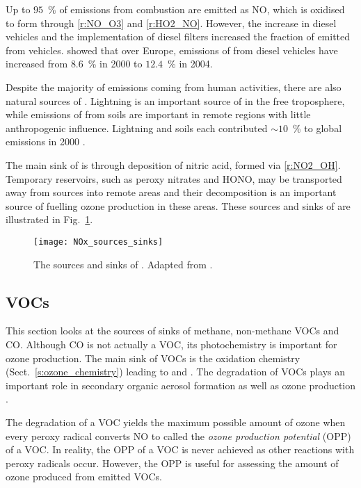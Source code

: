 Up to $95$~\% of  emissions from combustion are emitted as NO, which is oxidised to form  through \eqref{r:NO_O3} and \eqref{r:HO2_NO}.
However, the increase in diesel vehicles and the implementation of diesel filters increased the fraction of emitted  from vehicles.
\citet{Grice:2009} showed that over Europe, emissions of  from diesel vehicles have increased from $8.6$~\% in 2000 to $12.4$~\% in 2004.

Despite the majority of  emissions coming from human activities, there are also natural sources of .
Lightning is an important source of  in the free troposphere, while emissions of  from soils are important in remote regions with little anthropogenic influence.
Lightning and soils each contributed ${\sim}10$~\% to global  emissions in 2000 \citep{Seinfeld:2006}.

The main sink of  is through deposition of nitric acid, formed via \eqref{r:NO2_OH}.
Temporary reservoirs, such as peroxy nitrates and HONO, may be transported away from sources into remote areas and their decomposition is an important source of  fuelling ozone production in these areas.
These sources and sinks of  are illustrated in Fig.~\ref{f:NOx_sources_sinks}.
\begin{figure}[t]%
	\begin{center}%
        \caption[ sources and sinks]{The sources and sinks of . Adapted from \citet{Seinfeld:2006}.}%
        \texttt{[image: NOx\_sources\_sinks]}%
        \label{f:NOx_sources_sinks}%
	\end{center}%
\end{figure}%

\subsection{VOCs}
This section looks at the sources of sinks of methane, non-methane VOCs and CO.
Although CO is not actually a VOC, its photochemistry is important for ozone production.
The main sink of VOCs is the oxidation chemistry (Sect.~\ref{s:ozone_chemistry}) leading to  and .
The degradation of VOCs plays an important role in secondary organic aerosol formation as well as ozone production \citep{Hallquist:2009}.

The degradation of a VOC yields the maximum possible amount of ozone when every peroxy radical converts NO to  called the \emph{ozone production potential} (OPP) of a VOC.
In reality, the OPP of a VOC is never achieved as other reactions with peroxy radicals occur.
However, the OPP is useful for assessing the amount of ozone produced from emitted VOCs.

